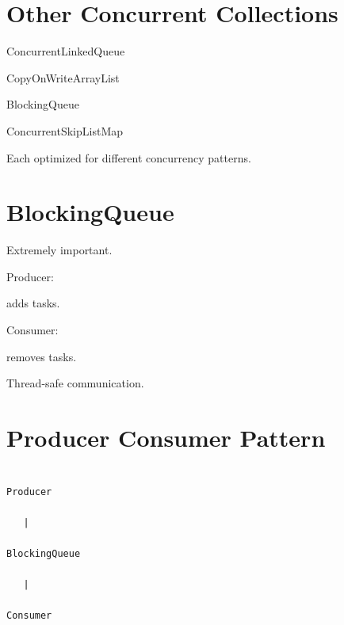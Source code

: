 \documentclass[11pt,a4paper]{book}
\begin{document}
\section{Other Concurrent Collections}


ConcurrentLinkedQueue


CopyOnWriteArrayList


BlockingQueue


ConcurrentSkipListMap


Each optimized for different
concurrency patterns.


\section{BlockingQueue}

Extremely important.


Producer:

adds tasks.


Consumer:

removes tasks.


Thread-safe communication.


\section{Producer Consumer Pattern}

\begin{verbatim}

Producer

   |

BlockingQueue

   |

Consumer

\end{verbatim}
\end{document}
